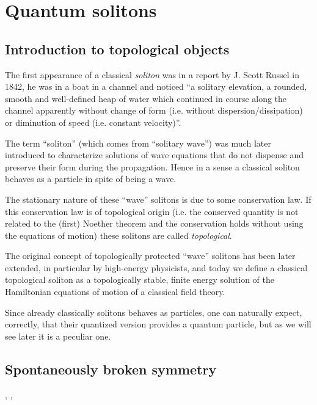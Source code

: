 \documentclass[../main/main.tex]{subfiles}
\begin{document}

\chapter{Quantum solitons}

\section{Introduction to topological objects}

The first appearance of a classical \emph{soliton} was in a report by J. Scott Russel in 1842, he was in a boat in a channel and noticed ``a solitary elevation, a rounded, smooth and well-defined heap of water which continued in course along the channel apparently without change of form (i.e. without dispersion/dissipation) or diminution of speed (i.e. constant velocity)''. 

The term ``soliton'' (which comes from ``solitary wave'') was much later introduced to characterize solutions of wave equations that do not dispense and preserve their form during the propagation. Hence in a sense a classical soliton behaves as a particle in spite of being a wave. 

The stationary nature of these ``wave'' solitons is due to some conservation law. If this conservation law is of topological origin (i.e. the conserved quantity is not related to the (first) Noether theorem and the conservation holds without using the equations of motion) these solitons are called \emph{topological}. 

The original concept of topologically protected ``wave'' solitons has been later extended, in particular by high-energy physicists, and today we define a classical topological soliton as a topologically stable, finite energy solution of the Hamiltonian equations of motion of a classical field theory. 

Since already classically solitons behaves as particles, one can naturally expect, correctly, that their quantized version provides a quantum particle, but as we will see later it is a peculiar one. 

\section{Spontaneously broken symmetry}\label{sec:SSB}

\cite[Chapter C.1]{Strocchi_1985}, \cite{Strocchi:2012}, \cite[Chapter 1]{Shifman:2012}\\
\end{document}
